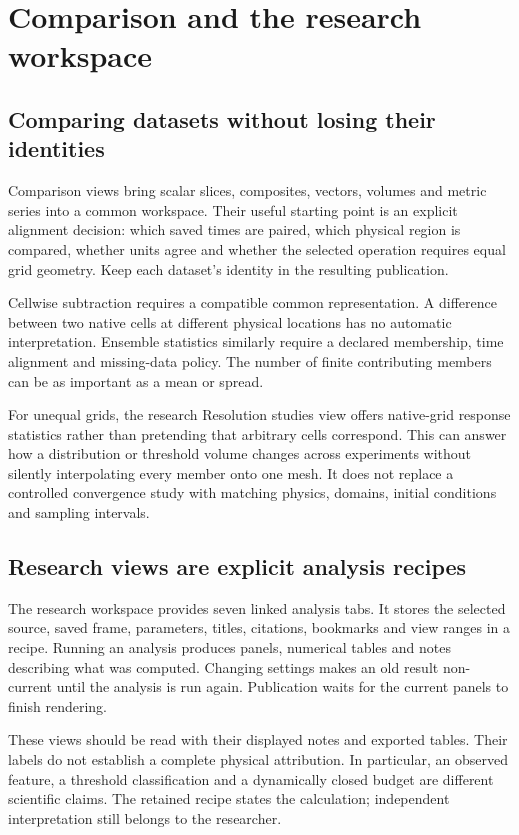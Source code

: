 \section{Comparison and the research workspace}
\subsection{Comparing datasets without losing their identities}
Comparison views bring scalar slices, composites, vectors, volumes and metric
series into a common workspace. Their useful starting point is an explicit
alignment decision: which saved times are paired, which physical region is
compared, whether units agree and whether the selected operation requires equal
grid geometry. Keep each dataset's identity in the resulting publication.

Cellwise subtraction requires a compatible common representation. A difference
between two native cells at different physical locations has no automatic
interpretation. Ensemble statistics similarly require a declared membership,
time alignment and missing-data policy. The number of finite contributing
members can be as important as a mean or spread.

For unequal grids, the research Resolution studies view offers native-grid
response statistics rather than pretending that arbitrary cells correspond.
This can answer how a distribution or threshold volume changes across
experiments without silently interpolating every member onto one mesh. It does
not replace a controlled convergence study with matching physics, domains,
initial conditions and sampling intervals.

\subsection{Research views are explicit analysis recipes}
The research workspace provides seven linked analysis tabs. It stores the
selected source, saved frame, parameters, titles, citations, bookmarks and view
ranges in a recipe. Running an analysis produces panels, numerical tables and
notes describing what was computed. Changing settings makes an old result
non-current until the analysis is run again. Publication waits for the current
panels to finish rendering.

These views should be read with their displayed notes and exported tables.
Their labels do not establish a complete physical attribution. In particular,
an observed feature, a threshold classification and a dynamically closed budget
are different scientific claims. The retained recipe states the calculation;
independent interpretation still belongs to the researcher.

